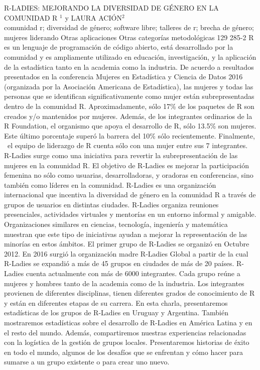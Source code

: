 \A
{R-LADIES: MEJORANDO LA DIVERSIDAD DE GÉNERO EN LA COMUNIDAD R}
{$^1$ y LAURA ACIÓN$^2$}
{
\\}
{comunidad r; diversidad de género; software libre; talleres de r; brecha de género; mujeres liderando} 
 {Otras aplicaciones} 
 {Otras categorías metodológicas} 
 {129} 
 {285-2}
{R es un lenguaje de programación de código abierto, está desarrollado por la comunidad y es ampliamente utilizado en educación, investigación, y la aplicación de la estadística tanto en la academia como la industria. De acuerdo a resultados presentados en la conferencia Mujeres en Estadística y Ciencia de Datos 2016 (organizada por la Asociación Americana de Estadística), las mujeres y todas las personas que se identifican significativamente como mujer están subrepresentadas dentro de la comunidad R. Aproximadamente, sólo 17\% de los paquetes de R son creados y/o mantenidos por mujeres. Además, de los integrantes ordinarios de la R Foundation, el organismo que apoya el desarrollo de R, sólo 13.5\% son mujeres. Este último porcentaje superó la barrera del 10\% sólo recientemente. Finalmente,  el equipo de liderazgo de R cuenta sólo con una mujer entre sus 7 integrantes. R-Ladies surge como una iniciativa para revertir la subrepresentación de las mujeres en la comunidad R. El objetivo de R-Ladies es mejorar la participación femenina no sólo como usuarias, desarrolladoras, y oradoras en conferencias, sino también como líderes en la comunidad. R-Ladies es una organización internacional que incentiva la diversidad de género en la comunidad R a través de grupos de usuarios en distintas ciudades. R-Ladies organiza reuniones presenciales, actividades virtuales y mentorías en un entorno informal y amigable. Organizaciones similares en ciencias, tecnología, ingeniería y matemática muestran que este tipo de iniciativas ayudan a mejorar la representación de las minorías en estos ámbitos. El primer grupo de R-Ladies se organizó en Octubre 2012. En 2016 surgió la organización madre R-Ladies Global a partir de la cual R-Ladies se expandió a más de 45 grupos en ciudades de más de 20 países. R-Ladies cuenta actualmente con más de 6000 integrantes. Cada grupo reúne a mujeres y hombres tanto de la academia como de la industria. Los integrantes provienen de diferentes disciplinas, tienen diferentes grados de conocimiento de R y están en diferentes etapas de su carrera. En esta charla, presentaremos estadísticas de los grupos de R-Ladies en Uruguay y Argentina. También mostraremos estadísticas sobre el desarrollo de R-Ladies en América Latina y en el resto del mundo. Además, compartiremos nuestras experiencias relacionadas con la logística de la gestión de grupos locales. Presentaremos historias de éxito en todo el mundo, algunos de los desafíos que se enfrentan y cómo hacer para sumarse a un grupo existente o para crear uno nuevo. }

